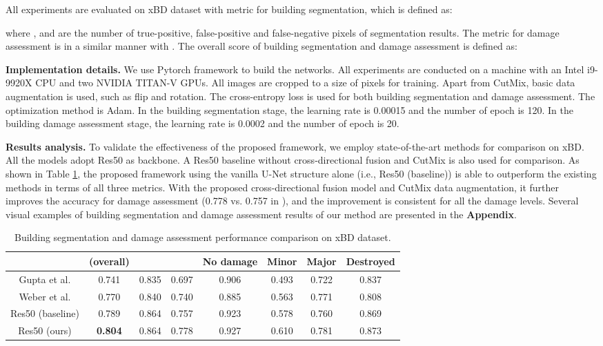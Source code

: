 \documentclass{article}
\begin{document}
All experiments are evaluated on xBD dataset with metric  for building segmentation, which is defined as:

where ,  and  are the number of true-positive, false-positive and false-negative pixels of segmentation results. The  metric for damage assessment is in a similar manner with . The overall score  of building segmentation and damage assessment is defined as:


\textbf{Implementation details.}
We use Pytorch framework to build the networks. All experiments are conducted on a machine with an Intel i9-9920X CPU and two NVIDIA TITAN-V GPUs. All images are cropped to a size of  pixels for training. Apart from CutMix, basic data augmentation is used, such as flip and rotation. The cross-entropy loss is used for both building segmentation and damage assessment. The optimization method is Adam. In the building segmentation stage, the learning rate is 0.00015 and the number of epoch is 120. In the building damage assessment stage, the learning rate is 0.0002 and the number of epoch is 20.

\textbf{Results analysis.}
To validate the effectiveness of the proposed framework, we employ state-of-the-art methods for comparison on xBD. All the models adopt Res50 as backbone. A Res50 baseline without cross-directional fusion and CutMix is also used for comparison. As shown in Table \ref{tabResults}, the proposed framework using the vanilla U-Net structure alone (i.e., Res50 (baseline)) is able to outperform the existing methods in terms of all three metrics. With the proposed cross-directional fusion model and CutMix data augmentation, it further improves the accuracy for damage assessment (0.778 vs. 0.757 in ), and the improvement is consistent for all the damage levels. 
Several visual examples of building segmentation and damage assessment results of our method are presented in the \textbf{Appendix}. 
\begin{table}
  \caption{Building segmentation and damage assessment performance comparison on xBD dataset.}
  \footnotesize
  \centering
  \begin{tabular}{cccccccc}
    \toprule
         &  (overall) &  &   & No damage    & Minor & Major & Destroyed \\
    \midrule
    Gupta et al. \cite{gupta2020rescuenet} & 0.741 & 0.835 &	0.697 &	0.906 &	0.493 &	0.722 &	0.837 \\
   Weber et al. \cite{weber2020building}  & 0.770 &	0.840 &	0.740 &	0.885 &	0.563 &	0.771 &	0.808   \\
   Res50 (baseline) & 0.789 & 0.864 &	0.757 &	0.923 &	0.578 &	0.760 &	0.869  \\
   Res50 (ours) &  \textbf{0.804} &	0.864 &	0.778 &	0.927 &	0.610 &	0.781 &	0.873   \\
    \bottomrule
  \end{tabular}
    \label{tabResults}
\end{table}
\end{document}
